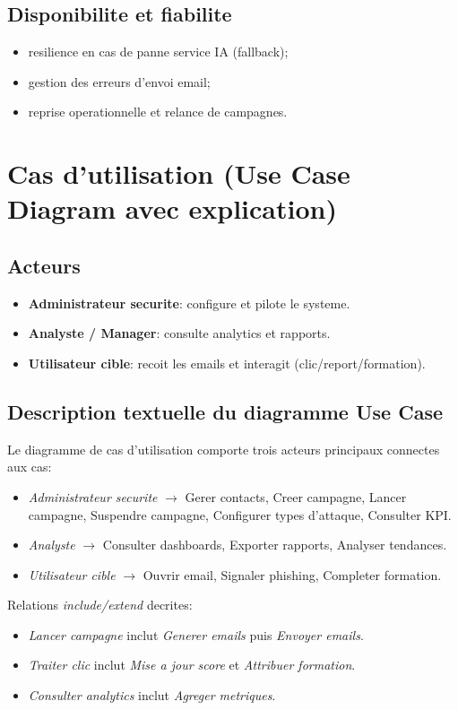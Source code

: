 \documentclass[12pt,a4paper,oneside]{report}
\begin{document}
\subsection{Disponibilite et fiabilite}
\begin{itemize}[leftmargin=1.2cm]
  \item resilience en cas de panne service IA (fallback);
  \item gestion des erreurs d'envoi email;
  \item reprise operationnelle et relance de campagnes.
\end{itemize}

\section{Cas d'utilisation (Use Case Diagram avec explication)}
\subsection{Acteurs}
\begin{itemize}[leftmargin=1.2cm]
  \item \textbf{Administrateur securite}: configure et pilote le systeme.
  \item \textbf{Analyste / Manager}: consulte analytics et rapports.
  \item \textbf{Utilisateur cible}: recoit les emails et interagit (clic/report/formation).
\end{itemize}

\subsection{Description textuelle du diagramme Use Case}
Le diagramme de cas d'utilisation comporte trois acteurs principaux connectes aux cas:
\begin{itemize}[leftmargin=1.2cm]
  \item \textit{Administrateur securite} $\rightarrow$ Gerer contacts, Creer campagne, Lancer campagne, Suspendre campagne, Configurer types d'attaque, Consulter KPI.
  \item \textit{Analyste} $\rightarrow$ Consulter dashboards, Exporter rapports, Analyser tendances.
  \item \textit{Utilisateur cible} $\rightarrow$ Ouvrir email, Signaler phishing, Completer formation.
\end{itemize}

Relations \textit{include/extend} decrites:
\begin{itemize}[leftmargin=1.2cm]
  \item \textit{Lancer campagne} inclut \textit{Generer emails} puis \textit{Envoyer emails}.
  \item \textit{Traiter clic} inclut \textit{Mise a jour score} et \textit{Attribuer formation}.
  \item \textit{Consulter analytics} inclut \textit{Agreger metriques}.
\end{itemize}
\end{document}
